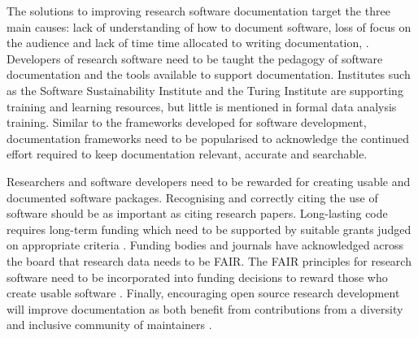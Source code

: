 \documentclass[../main.tex]{subfiles}
\begin{document}
The solutions to improving research software documentation target the three main causes: lack of understanding of how to document software, loss of focus on the audience and lack of time time allocated to writing documentation, \parencite{Rios2020}. 
Developers of research software need to be taught the pedagogy of software documentation and the tools available to support documentation.
Institutes such as the Software Sustainability Institute and the Turing Institute are supporting training and learning resources, but little is mentioned in formal data analysis training. 
Similar to the frameworks developed for software development, documentation frameworks need to be popularised to acknowledge the continued effort required to keep documentation relevant, accurate and searchable.

Researchers and software developers need to be rewarded for creating usable and documented software packages.
Recognising and correctly citing the use of software should be as important as citing research papers.
Long-lasting code requires long-term funding which need to be supported by suitable grants judged on appropriate criteria \parencite{Goble2014}.
Funding bodies and journals have acknowledged across the board that research data needs to be FAIR.
The FAIR principles for research software need to be incorporated into funding decisions to reward those who create usable software \parencite{Hong2022}.
Finally, encouraging open source research development will improve documentation as both benefit from contributions from a diversity and inclusive community of maintainers \parencite{Strasser2022}.
\newpage
\end{document}
